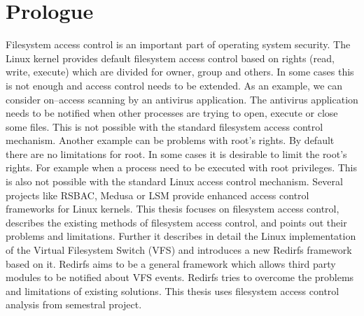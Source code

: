 \chapter{Prologue}
Filesystem access control is an important part of operating system security. The Linux
kernel provides default filesystem access control based on rights (read, write,
execute) which are divided for owner, group and others. In some cases this is not
enough and access control needs to be extended. As an example, we can consider
on--access scanning by an antivirus application. The antivirus application needs to
be notified when other processes are trying to open, execute or close some files. This
is not possible with the standard filesystem access control mechanism. Another example
can be problems with root's rights. By default there are no limitations for root. In
some cases it is desirable to limit the root's rights. For example when a process
need to be executed with root privileges. This is also not possible with the standard
Linux access control mechanism. Several projects like RSBAC, Medusa or LSM provide
enhanced access control frameworks for Linux kernels.
This thesis focuses on filesystem access control, describes the existing methods
of filesystem access control, and points out their problems and limitations. Further
it describes in detail the Linux implementation of the Virtual Filesystem Switch (VFS)
and introduces a new Redirfs framework based on it. Redirfs aims to be  a general
framework which allows third party modules to be notified about VFS events. Redirfs
tries to overcome the problems and limitations of existing solutions. This thesis uses
filesystem access control analysis from semestral project.

